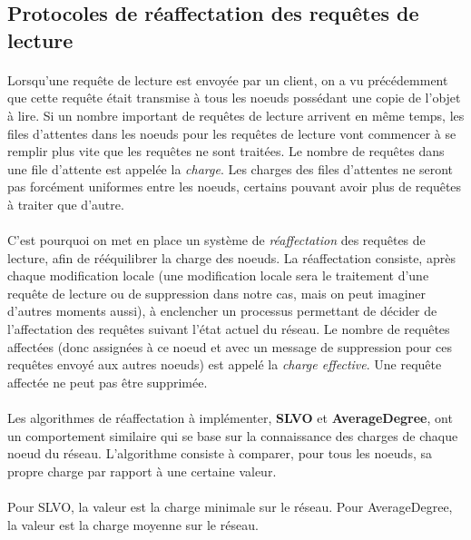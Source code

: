 \documentclass[12pt]{article}
\begin{document}
\subsection{Protocoles de réaffectation des requêtes de lecture}

\paragraph{} Lorsqu'une requête de lecture est envoyée par un client, on a vu précédemment que cette requête était transmise à tous les noeuds possédant une copie de l'objet à lire. Si un nombre important de requêtes de lecture arrivent en même temps, les files d'attentes dans les noeuds pour les requêtes de lecture vont commencer à se remplir plus vite que les requêtes ne sont traitées. Le nombre de requêtes dans une file d'attente est appelée la \textit{charge}. Les charges des files d'attentes ne seront pas forcément uniformes entre les noeuds, certains pouvant avoir plus de requêtes à traiter que d'autre.

\paragraph{} C'est pourquoi on met en place un système de \textit{réaffectation} des requêtes de lecture, afin de rééquilibrer la charge des noeuds. La réaffectation consiste, après chaque modification locale (une modification locale sera le traitement d'une requête de lecture ou de suppression dans notre cas, mais on peut imaginer d'autres moments aussi), à enclencher un processus permettant de décider de l'affectation des requêtes suivant l'état actuel du réseau. Le nombre de requêtes affectées (donc assignées à ce noeud et avec un message de suppression pour ces requêtes envoyé aux autres noeuds) est appelé la \textit{charge effective}. Une requête affectée ne peut pas être supprimée.

\paragraph{} Les algorithmes de réaffectation à implémenter, \textbf{SLVO} et \textbf{AverageDegree}, ont un comportement similaire qui se base sur la connaissance des charges de chaque noeud du réseau. L'algorithme consiste à comparer, pour tous les noeuds, sa propre charge par rapport à une certaine valeur.

\paragraph{} Pour SLVO, la valeur est la charge minimale sur le réseau. Pour AverageDegree, la valeur est la charge moyenne sur le réseau.
\end{document}
